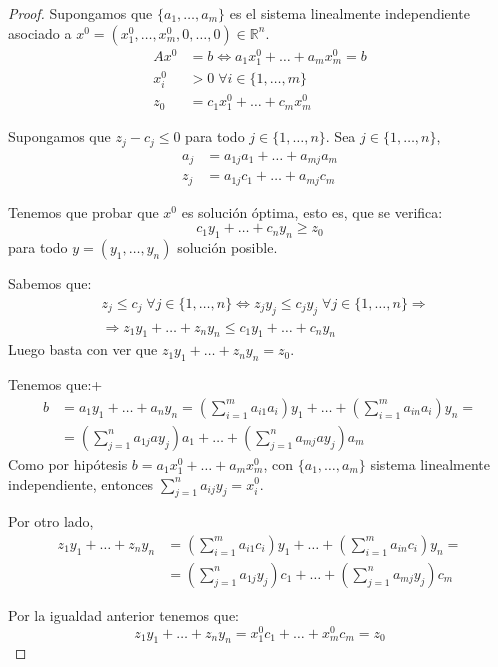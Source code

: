 \begin{proof}
    Supongamos que $\{a_1, \dots, a_m\}$ es el sistema linealmente independiente asociado a $x^0 = (x^0_1, \dots, x^0_m, 0, \dots, 0) \in \mathbb{R}^n$.
    \begin{align*}
        Ax^0  & = b \Leftrightarrow a_1x^0_1 + \dots + a_mx^0_m = b \\
        x^0_i & > 0 \; \forall i \in \{1, \dots, m\}                \\
        z_0   & = c_1x^0_1 + \dots + c_mx^0_m
    \end{align*}

    Supongamos que $z_j - c_j \leq 0$ para todo $j \in \{1, \dots, n\}$.
    Sea $j \in \{1, \dots, n\}$,
    \begin{align*}
        a_j & = a_{1j}a_1 + \dots + a_{mj}a_m \\
        z_j & = a_{1j}c_1 + \dots + a_{mj}c_m
    \end{align*}

    Tenemos que probar que $x^0$ es solución óptima, esto es, que se verifica:
    $$c_1y_1 + \dots + c_ny_n \geq z_0$$
    para todo $y = (y_1, \dots, y_n)$ solución posible.

    Sabemos que:
    \begin{align*}
         & z_j \leq c_j \; \forall j \in \{1, \dots, n\} \Leftrightarrow z_jy_j \leq c_jy_j \; \forall j \in \{1, \dots, n\} \Rightarrow \\
         & \Rightarrow z_1y_1 + \dots + z_ny_n \leq c_1y_1 + \dots + c_ny_n
    \end{align*}
    Luego basta con ver que $z_1y_1 + \dots + z_ny_n = z_0$.

    Tenemos que:+
    \begin{align*}
        b & = a_1y_1 + \dots + a_ny_n = \left(\sum_{i=1}^ma_{i1}a_i\right)y_1 + \dots + \left(\sum_{i=1}^ma_{in}a_i\right)y_n = \\
          & = \left(\sum_{j=1}^na_{1j}ay_j\right)a_1 + \dots + \left(\sum_{j=1}^na_{mj}ay_j\right)a_m
    \end{align*}
    Como por hipótesis $b = a_1x^0_1 + \dots + a_mx^0_m$, con $\{a_1, \dots, a_m\}$ sistema linealmente independiente, entonces $\sum_{j=1}^n a_{ij}y_j = x^0_i$.

    Por otro lado,
    \begin{align*}
        z_1y_1 + \dots + z_ny_n & = \left(\sum_{i=1}^ma_{i1}c_i\right)y_1 + \dots + \left(\sum_{i=1}^ma_{in}c_i\right)y_n = \\
                                & = \left(\sum_{j=1}^na_{1j}y_j\right)c_1 + \dots + \left(\sum_{j=1}^na_{mj}y_j\right)c_m
    \end{align*}

    Por la igualdad anterior tenemos que:
    $$z_1y_1 + \dots + z_ny_n = x^0_1c_1 + \dots + x^0_mc_m = z_0$$
\end{proof}

